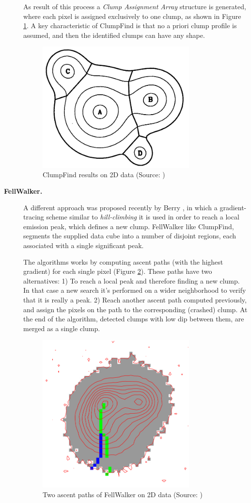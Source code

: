 \documentclass[letter, 11pt]{article}
\begin{document}
\begin{description}
    As result of this process a \textit{Clump Assignment Array} structure is generated, where each pixel is assigned exclusively to one clump, as shown in Figure \ref{fig:cf}. A key characteristic of ClumpFind is that no a priori clump profile is assumed, and then the identified clumps can have any shape.
    \begin{figure}[htpb!]
    \centering
    \includegraphics[width=8cm]{cf}
    \caption{ClumpFind results on 2D data (Source: \cite{Williams})}
    \label{fig:cf}
    \end{figure}

    \item[\textbf{FellWalker.}] A different approach was proposed recently by Berry \cite{Berry}, in which a gradient-tracing scheme similar to \textit{hill-climbing} it is used in order to reach a local emission peak, which defines a new clump. FellWalker like ClumpFind, segments the supplied data cube into a number of disjoint regions, each associated with a single significant peak.

    The algorithms works by computing ascent paths (with the highest gradient) for each single pixel (Figure \ref{fig:fw}). These paths have two alternatives: 1) To reach a local peak and therefore finding a new clump. In that case a new search it's performed on a wider neighborhood to verify that it is really a peak. 2) Reach another ascent path computed previously, and assign the pixels on the path to the corresponding (crashed) clump. At the end of the algorithm, detected clumps with low dip between them, are merged as a single clump.
    \begin{figure}[htpb!]
    \centering
    \includegraphics[width=8cm]{fw}
    \caption{Two ascent paths of FellWalker on 2D data (Source: \cite{Berry})}
    \label{fig:fw}
    \end{figure}


\end{description}
\end{document}
